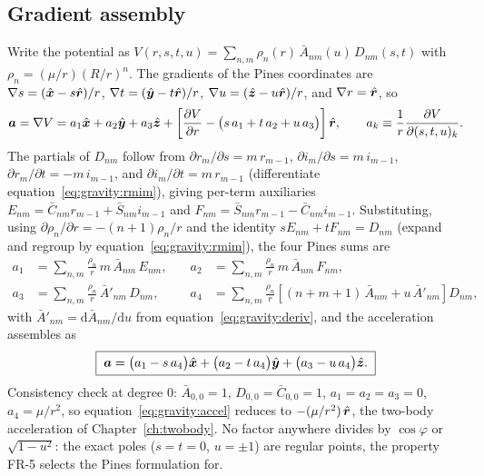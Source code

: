 \subsection{Gradient assembly}

Write the potential as $V(r, s, t, u) = \sum_{n,m} \rho_n(r)\,
\bar{A}_{nm}(u)\, D_{nm}(s,t)$ with
$\rho_n = (\mu/r)(R/r)^n$. The gradients of the Pines coordinates are
$\nabla s = (\hat{\bm{x}} - s\hat{\bm{r}})/r$,
$\nabla t = (\hat{\bm{y}} - t\hat{\bm{r}})/r$,
$\nabla u = (\hat{\bm{z}} - u\hat{\bm{r}})/r$, and
$\nabla r = \hat{\bm{r}}$, so
\begin{equation}
  \bm{a} = \nabla V
  = a_1 \hat{\bm{x}} + a_2 \hat{\bm{y}} + a_3 \hat{\bm{z}}
  + \left[\frac{\partial V}{\partial r}
      - \bigl(s\,a_1 + t\,a_2 + u\,a_3\bigr)\right]\hat{\bm{r}},
  \qquad
  a_k \equiv \frac{1}{r}\frac{\partial V}{\partial (s,t,u)_k}.
  \label{eq:gravity:gradient}
\end{equation}
The partials of $D_{nm}$ follow from
$\partial r_m/\partial s = m\, r_{m-1}$,
$\partial i_m/\partial s = m\, i_{m-1}$,
$\partial r_m/\partial t = -m\, i_{m-1}$, and
$\partial i_m/\partial t = m\, r_{m-1}$ (differentiate
equation~\eqref{eq:gravity:rmim}), giving per-term auxiliaries
$E_{nm} = \bar{C}_{nm} r_{m-1} + \bar{S}_{nm} i_{m-1}$ and
$F_{nm} = \bar{S}_{nm} r_{m-1} - \bar{C}_{nm} i_{m-1}$. Substituting,
using $\partial \rho_n/\partial r = -(n+1)\rho_n / r$ and the identity
$s E_{nm} + t F_{nm} = D_{nm}$ (expand and regroup by
equation~\eqref{eq:gravity:rmim}), the four Pines sums are
\begin{equation}
  \begin{aligned}
    a_1 &= \sum_{n,m} \frac{\rho_n}{r}\, m\, \bar{A}_{nm}\, E_{nm},
    &\quad
    a_2 &= \sum_{n,m} \frac{\rho_n}{r}\, m\, \bar{A}_{nm}\, F_{nm},\\
    a_3 &= \sum_{n,m} \frac{\rho_n}{r}\, \bar{A}'_{nm}\, D_{nm},
    &\quad
    a_4 &= \sum_{n,m} \frac{\rho_n}{r}
      \left[(n+m+1)\,\bar{A}_{nm} + u\,\bar{A}'_{nm}\right] D_{nm},
  \end{aligned}
  \label{eq:gravity:sums}
\end{equation}
with $\bar{A}'_{nm} = \mathrm{d}\bar{A}_{nm}/\mathrm{d}u$ from
equation~\eqref{eq:gravity:deriv}, and the acceleration assembles as
\begin{equation}
  \boxed{\;\bm{a} = \bigl(a_1 - s\,a_4\bigr)\hat{\bm{x}}
        + \bigl(a_2 - t\,a_4\bigr)\hat{\bm{y}}
        + \bigl(a_3 - u\,a_4\bigr)\hat{\bm{z}}.\;}
  \label{eq:gravity:accel}
\end{equation}
Consistency check at degree 0: $\bar{A}_{0,0} = 1$, $D_{0,0} =
\bar{C}_{0,0} = 1$, $a_1 = a_2 = a_3 = 0$, $a_4 = \mu/r^2$, so
equation~\eqref{eq:gravity:accel} reduces to
$-(\mu/r^2)\,\hat{\bm{r}}$, the two-body acceleration of
Chapter~\ref{ch:twobody}. No factor anywhere divides by
$\cos\varphi$ or $\sqrt{1-u^2}$: the exact poles ($s = t = 0$,
$u = \pm 1$) are regular points, the property FR-5 selects the Pines
formulation for.

